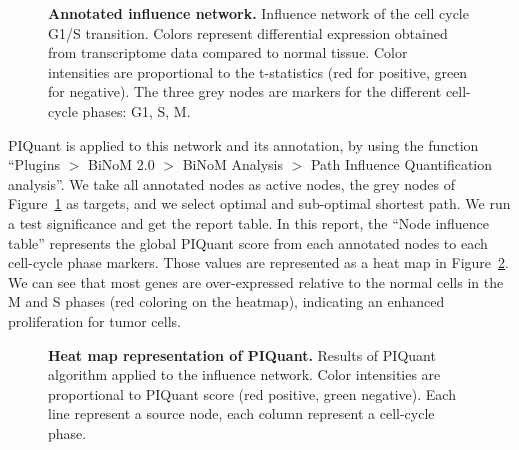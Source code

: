 \documentclass[10pt]{bmc_article}
\newenvironment{bmcformat}{\baselineskip20pt\sloppy\setboolean{publ}{false}}{\baselineskip20pt\sloppy}
\begin{document}
\begin{bmcformat}
\begin{figure}[h]
  \caption{\label{InflAnnotNet} \textbf{Annotated influence network.}
    Influence network of the cell cycle G1/S transition. Colors represent differential
expression obtained from transcriptome data compared to normal tissue. Color 
intensities are proportional to the t-statistics (red for positive, green for
negative). The three grey nodes are markers for the different cell-cycle phases: G1, S, M.}
\end{figure}

PIQuant is applied to this network and its annotation, by using the function
``Plugins $>$ BiNoM 2.0 $>$ BiNoM Analysis $>$ Path Influence Quantification
analysis''. We take all annotated nodes as active nodes, the grey nodes of
Figure~\ref{InflAnnotNet} as targets, and we select optimal and sub-optimal 
shortest path. We run a test significance and get the report table. In this
report, the ``Node influence table'' represents the global PIQuant score from
each annotated nodes to each cell-cycle phase markers. Those values are
represented as a heat map in Figure~\ref{PIQuantHeatMap}. We can see that most
genes are over-expressed relative to the normal cells in the M and S phases (red
coloring on the heatmap), indicating an enhanced proliferation for tumor cells.

\begin{figure}[h]
  \caption{\label{PIQuantHeatMap} \textbf{Heat map representation of PIQuant.}
    Results of PIQuant algorithm applied to the influence network. Color
intensities are proportional to PIQuant score (red positive, green negative).
Each line represent a source node, each column represent a cell-cycle phase.}
\end{figure}




\end{bmcformat}
\end{document}
